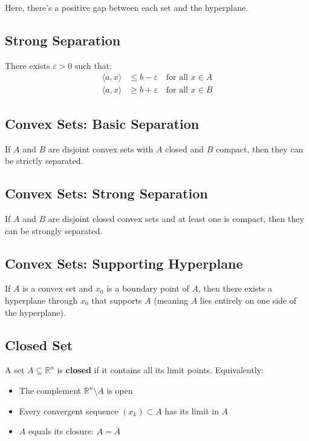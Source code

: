 \documentclass{tufte-handout}
\begin{document}
Here, there's a positive gap between each set and the hyperplane.

\subsection{Strong Separation}
There exists $\varepsilon > 0$ such that:
\begin{align}
\langle a, x \rangle &\leq b - \varepsilon \quad \text{for all } x \in A \\
\langle a, x \rangle &\geq b + \varepsilon \quad \text{for all } x \in B
\end{align}



\subsection{Convex Sets: Basic Separation}
If $A$ and $B$ are disjoint convex sets with $A$ closed and $B$ compact, then they can be strictly separated.


\subsection{Convex Sets: Strong Separation}
If $A$ and $B$ are disjoint closed convex sets and at least one is compact, then they can be strongly separated.


\subsection{Convex Sets: Supporting Hyperplane}
If $A$ is a convex set and $x_0$ is a boundary point of $A$, then there exists a hyperplane through $x_0$ that supports $A$ (meaning $A$ lies entirely on one side of the hyperplane).




\subsection{Closed Set}
A set $A \subseteq \mathbb{R}^n$ is \textbf{closed} if it contains all its limit points. Equivalently:
\begin{itemize}
    \item The complement $\mathbb{R}^n \setminus A$ is open
    \item Every convergent sequence $(x_k) \subset A$ has its limit in $A$
    \item $A$ equals its closure: $A = \overline{A}$
\end{itemize}
\end{document}
